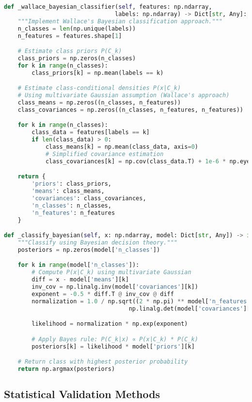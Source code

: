 \begin{lstlisting}[language=Python, caption=Bayesian classifier validation]
def _wallace_bayesian_classifier(self, features: np.ndarray,
                                labels: np.ndarray) -> Dict[str, Any]:
    """Implement Wallace's Bayesian classification approach."""
    n_classes = len(np.unique(labels))
    n_features = features.shape[1]

    # Estimate class priors P(C_k)
    class_priors = np.zeros(n_classes)
    for k in range(n_classes):
        class_priors[k] = np.mean(labels == k)

    # Estimate class-conditional densities P(x|C_k)
    # Using multivariate Gaussian assumption (Wallace's approach)
    class_means = np.zeros((n_classes, n_features))
    class_covariances = np.zeros((n_classes, n_features, n_features))

    for k in range(n_classes):
        class_data = features[labels == k]
        if len(class_data) > 0:
            class_means[k] = np.mean(class_data, axis=0)
            # Simplified covariance estimation
            class_covariances[k] = np.cov(class_data.T) + 1e-6 * np.eye(n_features)

    return {
        'priors': class_priors,
        'means': class_means,
        'covariances': class_covariances,
        'n_classes': n_classes,
        'n_features': n_features
    }

def _classify_bayesian(self, x: np.ndarray, model: Dict[str, Any]) -> int:
    """Classify using Bayesian decision theory."""
    posteriors = np.zeros(model['n_classes'])

    for k in range(model['n_classes']):
        # Compute P(x|C_k) using multivariate Gaussian
        diff = x - model['means'][k]
        inv_cov = np.linalg.inv(model['covariances'][k])
        exponent = -0.5 * diff.T @ inv_cov @ diff
        normalization = 1.0 / np.sqrt((2 * np.pi) ** model['n_features'] *
                                    np.linalg.det(model['covariances'][k]))

        likelihood = normalization * np.exp(exponent)

        # Apply Bayes rule: P(C_k|x) ∝ P(x|C_k) * P(C_k)
        posteriors[k] = likelihood * model['priors'][k]

    # Return class with highest posterior probability
    return np.argmax(posteriors)
\end{lstlisting}

\subsection{Statistical Validation Methods}

